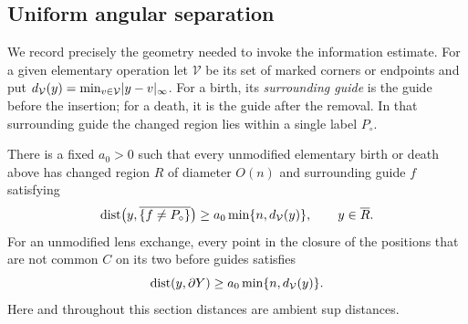 \subsection{Uniform angular separation}

We record precisely the geometry needed to invoke the information
estimate.  For a given elementary operation let $\mathcal V$ be its
set of marked corners or endpoints and put
$d_{\mathcal V}(y)=\min_{v\in\mathcal V}\lvert y-v\rvert_\infty$.
For a birth, its \emph{surrounding guide} is the guide before the
insertion; for a death, it is the guide after the removal.  In that
surrounding guide the changed region lies within a single label
$P_\circ$.

\begin{lemma}
\label{lem:geometry-angular}
There is a fixed $a_0>0$ such that every unmodified elementary birth or
death above has changed region $R$ of diameter $O(n)$ and surrounding
guide $f$ satisfying
\begin{equation}
 \operatorname{dist}\bigl(y,\overline{\{f\ne P_\circ\}}\bigr)
 \ge a_0\min\{n,d_{\mathcal V}(y)\},
 \qquad y\in\overline R.
 \label{eq:geometry-birth-clearance}
\end{equation}
For an unmodified lens exchange, every point in the closure of the
positions that are not common $C$ on its two before guides satisfies
\begin{equation}
 \operatorname{dist}(y,\partial Y)
 \ge a_0\min\{n,d_{\mathcal V}(y)\}.
 \label{eq:geometry-exchange-clearance}
\end{equation}
Here and throughout this section distances are ambient sup distances.
\end{lemma}

